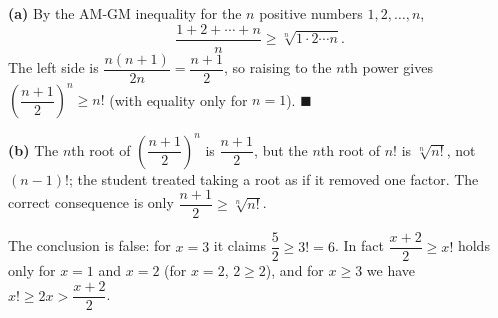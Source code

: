 \textbf{(a)} By the AM-GM inequality for the $n$ positive numbers $1,2,\dots,n$,
\[\dfrac{1+2+\cdots+n}{n}\ge\sqrt[n]{1\cdot2\cdots n}.\]
The left side is $\dfrac{n(n+1)}{2n}=\dfrac{n+1}{2}$, so raising to the $n$th power gives $\left(\dfrac{n+1}{2}\right)^n\ge n!$ (with equality only for $n=1$). $\blacksquare$

\textbf{(b)} The $n$th root of $\left(\dfrac{n+1}{2}\right)^n$ is $\dfrac{n+1}{2}$, but the $n$th root of $n!$ is $\sqrt[n]{n!}$, not $(n-1)!$; the student treated taking a root as if it removed one factor. The correct consequence is only $\dfrac{n+1}{2}\ge\sqrt[n]{n!}$.

The conclusion is false: for $x=3$ it claims $\dfrac{5}{2}\ge3!=6$. In fact $\dfrac{x+2}{2}\ge x!$ holds only for $x=1$ and $x=2$ (for $x=2$, $2\ge2$), and for $x\ge3$ we have $x!\ge2x>\dfrac{x+2}{2}$.
